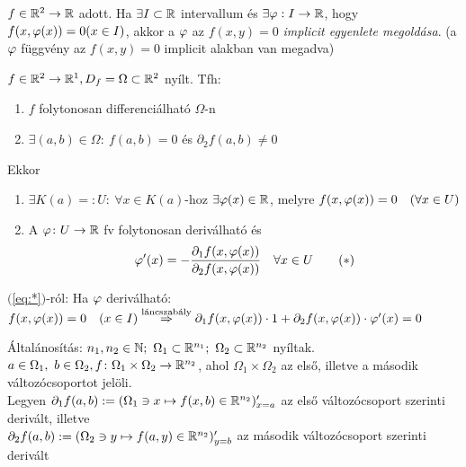 \begin{de}$f\in\mathbb{R}^2\to\mathbb{R}$ adott. Ha $\exists I\subset \mathbb{R}$ intervallum és $\exists \varphi: I\to\mathbb{R}$, hogy $f(x,\varphi(x))=0
  (x\in I)$, akkor a $\varphi$ az $f(x,y) =0$ \emph{implicit egyenlete megoldása}. (a $\varphi$ függvény az $f(x,y)=0$
  implicit alakban van megadva)
\end{de}

\begin{te} $f\in\mathbb{R}^2\to\mathbb{R}^1,\\D_f=\Omega\subset\mathbb{R}^2$ nyílt. Tfh:
  {\listazjromai \begin{enumerate}
  \item $f$ folytonosan differenciálható $\Omega$-n
  \item $\exists (a,b) \in \Omega:\ f(a,b)=0$ és $\partial_2f(a,b)\neq 0$
  \end{enumerate}}
  Ekkor
  {\listazjbetu
    \begin{enumerate}
    \item $\exists K(a) =: U\colon\ \forall x\in K(a)$-hoz $\exists \varphi(x)\in \mathbb{R}$, melyre $f(x,\varphi(x)) = 0\quad(\forall
      x\in U)$
    \item A $\varphi\colon U\to\mathbb{R}$ fv folytonosan deriválható és
      \[\varphi'(x) = - \dfrac{\partial_1f(x,\varphi(x))}{\partial_2f(x,\varphi(x))}\quad \forall x\in U \tag{$*$}\label{eq:*}\]
    \end{enumerate}
  }
\end{te}

\begin{Megj}
\item $($\ref{eq:*}$)$-ról: Ha $\varphi$ deriválható: $f(x,\varphi(x))=0\quad(x\in I) \stackrel{\text{láncszabály}}{\Rightarrow}\\
  \partial_1f(x,\varphi(x))\cdot1 + \partial_2f(x,\varphi(x))\cdot\varphi'(x) = 0$ 
\item Általánosítás: $n_1,n_2\in\N;\ \Omega_1\subset\R^{n_1};\ \Omega_2\subset\R^{n_2}$ nyíltak. $a\in\Omega_1,\
  b\in\Omega_2,\\ f\colon \Omega_1\times\Omega_2\to\mathbb{R}^{n_2}$, ahol $\Omega_1 \times \Omega_2$ az első, illetve a második
  változócsoportot jelöli.\\
  Legyen $\partial_1f(a,b) := (\Omega_1\owns x\mapsto f(x,b)\in\mathbb{R}^{n_2})'_{x=a}$ az első változócsoport szerinti
  derivált, illetve\\$\partial_2f(a,b) := (\Omega_2\owns y\mapsto f(a,y)\in\mathbb{R}^{n_2})'_{y=b}$ az második
  változócsoport szerinti derivált
\end{Megj}

